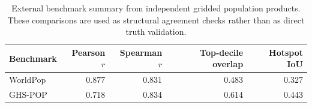 \begin{table}[H]
\centering
\caption{External benchmark summary from independent gridded population products. These comparisons are used as structural agreement checks rather than as direct truth validation.}
\label{tab:external-benchmark}
\begin{tabular}{lrrrr}
\toprule
Benchmark & Pearson $r$ & Spearman $r$ & Top-decile overlap & Hotspot IoU \\
\midrule
WorldPop & 0.877 & 0.831 & 0.483 & 0.327 \\
GHS-POP & 0.718 & 0.834 & 0.614 & 0.443 \\
\bottomrule
\end{tabular}
\end{table}
